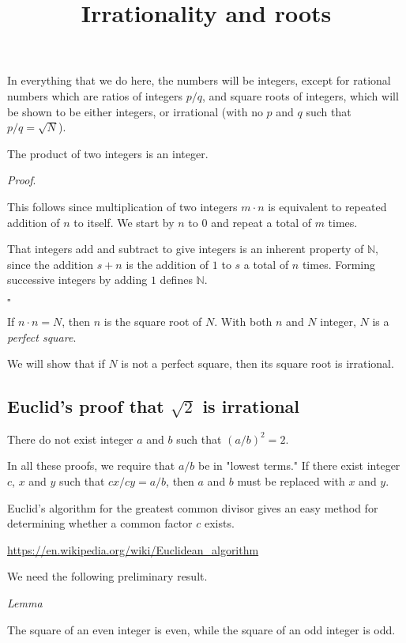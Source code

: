 \documentclass[11pt, oneside]{article}
\title{Irrationality and roots}
\date{}
\begin{document}
\maketitle
\Large


In everything that we do here, the numbers will be integers, except for rational numbers which are ratios of integers $p/q$, and square roots of integers, which will be shown to be either integers, or irrational (with no $p$ and $q$ such that $p/q = \sqrt{N}$).

The product of two integers is an integer.  

\emph{Proof}.

This follows since multiplication of two integers $m \cdot n$ is equivalent to repeated addition of $n$ to itself.  We start by $n$ to $0$ and repeat a total of $m$ times.

That integers add and subtract to give integers is an inherent property of $\mathbb{N}$, since the addition $s + n$ is the addition of $1$ to $s$ a total of $n$ times. Forming successive integers by adding $1$ defines $\mathbb{N}$.

$\square$

If $n \cdot n = N$, then $n$ is the square root of $N$.  With both $n$ and $N$ integer, $N$ is a \emph{perfect square}.  

We will show that if $N$ is not a perfect square, then its square root is irrational.  

\subsection*{Euclid's proof that $\sqrt{2}$ is irrational}

There do not exist integer $a$ and $b$ such that $(a/b)^2 = 2$.  

In all these proofs, we require that $a/b$ be in "lowest terms."  If there exist integer $c$, $x$ and $y$ such that $cx/cy = a/b$, then $a$ and $b$ must be replaced with $x$ and $y$.

Euclid's algorithm for the greatest common divisor gives an easy method for determining whether a common factor $c$ exists.

\url{https://en.wikipedia.org/wiki/Euclidean_algorithm}

We need the following preliminary result.

\emph{Lemma}

The square of an even integer is even, while the square of an odd integer is odd.
\end{document}
